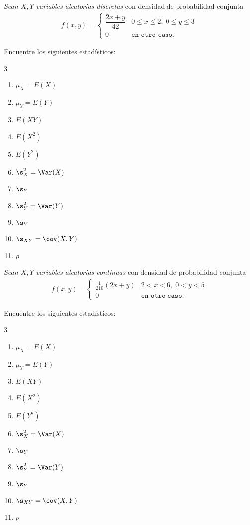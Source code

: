  \begin{ejemplo}
  \label{sol:0.3.25}
  \emph{Sean $X,Y$ variables aleatorias discretas} con densidad de probabilidad conjunta
  \begin{align}f(x,y)=
   \begin{cases}
    \dfrac{2x+y}{42} & 0\leq x \leq 2,\; 0\leq y \leq 3 \\
    0 & \texttt{en otro caso}.
   \end{cases}
  \end{align}
 \end{ejemplo}
 

Encuentre los siguientes estadísticos:
\begin{multicols}{3}
 \begin{enumerate}
 \item $\mu_X = E(X)$ %
 \item $\mu_Y = E(Y)$ %
 \item $ E(XY)$ %
 \item $E(X^2)$ %
 \item $E(Y^2)$ %
 \item $\s^2_X = \Var(X)$ %
 \item $\s_{Y}$
 \item $\s^2_Y = \Var(Y)$ %
 \item $\s_{Y}$
 \item $\s_{XY} =\cov(X,Y)$ %
 \item $\rho$
\end{enumerate}
\end{multicols}






 \begin{ejemplo}
  \label{sol:0.3.26}
  \emph{Sean $X,Y$ variables aleatorias continuas} con densidad de probabilidad conjunta
  \begin{align}f(x,y)=
   \begin{cases}
    \frac{1}{210}(2x+y) & 2 < x < 6,\; 0<y<5 \\
    0 & \texttt{en otro caso}.
   \end{cases}
  \end{align}
 \end{ejemplo}

 

Encuentre los siguientes estadísticos:
\begin{multicols}{3}
 \begin{enumerate}
 \item $\mu_X = E(X)$ %
 \item $\mu_Y = E(Y)$ %
 \item $ E(XY)$ %
 \item $E(X^2)$ %
 \item $E(Y^2)$ %
 \item $\s^2_X = \Var(X)$ %
 \item $\s_{Y}$
 \item $\s^2_Y = \Var(Y)$ %
 \item $\s_{Y}$
 \item $\s_{XY} =\cov(X,Y)$ %
 \item $\rho$
\end{enumerate}
\end{multicols}




